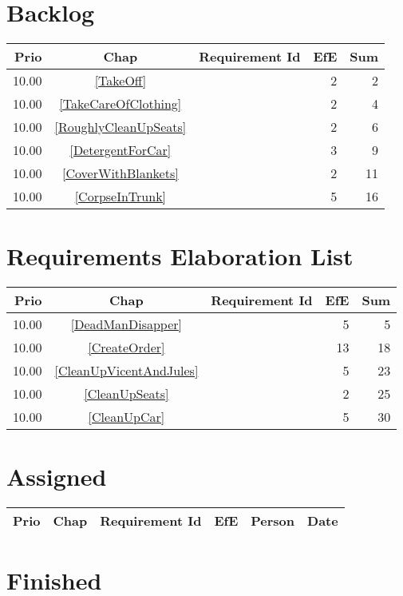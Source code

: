 \section{Backlog}
\begin{longtable}{|r|c|p{7cm}||r|r|} \hline
\textbf{Prio} & \textbf{Chap} & \textbf{Requirement Id} & \textbf{EfE} & \textbf{Sum} \\ \hline\endhead
10.00 & \ref{TakeOff} & \nameref{TakeOff} & 2 & 2 \\ \hline
10.00 & \ref{TakeCareOfClothing} & \nameref{TakeCareOfClothing} & 2 & 4 \\ \hline
10.00 & \ref{RoughlyCleanUpSeats} & \nameref{RoughlyCleanUpSeats} & 2 & 6 \\ \hline
10.00 & \ref{DetergentForCar} & \nameref{DetergentForCar} & 3 & 9 \\ \hline
10.00 & \ref{CoverWithBlankets} & \nameref{CoverWithBlankets} & 2 & 11 \\ \hline
10.00 & \ref{CorpseInTrunk} & \nameref{CorpseInTrunk} & 5 & 16 \\ \hline
\end{longtable}\section{Requirements Elaboration List}
\begin{longtable}{|r|c|p{7cm}||r|r|} \hline
\textbf{Prio} & \textbf{Chap} & \textbf{Requirement Id} & \textbf{EfE} & \textbf{Sum} \\ \hline\endhead
10.00 & \ref{DeadManDisapper} & \nameref{DeadManDisapper} & 5 & 5 \\ \hline
10.00 & \ref{CreateOrder} & \nameref{CreateOrder} & 13 & 18 \\ \hline
10.00 & \ref{CleanUpVicentAndJules} & \nameref{CleanUpVicentAndJules} & 5 & 23 \\ \hline
10.00 & \ref{CleanUpSeats} & \nameref{CleanUpSeats} & 2 & 25 \\ \hline
10.00 & \ref{CleanUpCar} & \nameref{CleanUpCar} & 5 & 30 \\ \hline
\end{longtable}\section{Assigned}
\begin{longtable}{|r|c|p{6.5cm}||r|l|l|} \hline
\textbf{Prio} & \textbf{Chap} & \textbf{Requirement Id} & \textbf{EfE} & \textbf{Person} & \textbf{Date} \\ \hline\endhead
\end{longtable}\section{Finished}
